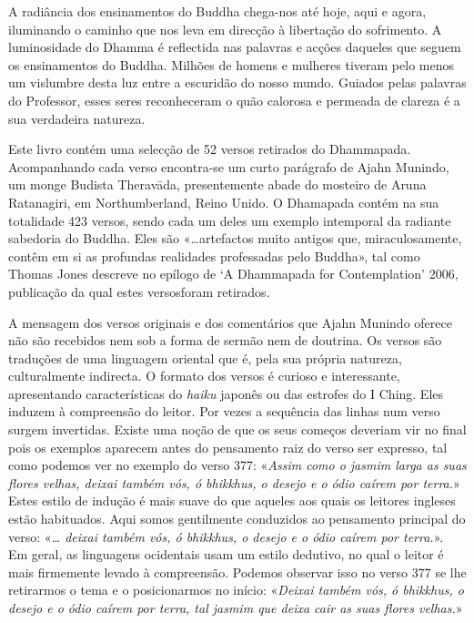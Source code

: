 
A radiância dos ensinamentos do Buddha chega-nos até hoje, aqui e agora, iluminando o caminho que nos leva em direcção à libertação do sofrimento. A luminosidade do Dhamma é reflectida nas palavras e acções daqueles que seguem os ensinamentos do Buddha. Milhões de homens e mulheres tiveram pelo menos um vislumbre desta luz entre a escuridão do nosso mundo. Guiados pelas palavras do Professor, esses seres reconheceram o quão calorosa e permeada de clareza é a sua verdadeira natureza.

Este livro contém uma selecção de 52 versos retirados do Dhammapada. Acompanhando cada verso encontra-se um curto parágrafo de Ajahn Munindo, um monge Budista Theravāda, presentemente abade do mosteiro de Aruna Ratanagiri, em Northumberland, Reino Unido. O Dhamapada contém na sua totalidade 423 versos, sendo cada um deles um exemplo intemporal da radiante sabedoria do Buddha. Eles são «…artefactos muito antigos que, miraculosamente, contêm em si as profundas realidades professadas pelo Buddha», tal como Thomas Jones descreve no epílogo de ‘A Dhammapada for Contemplation’ 2006, publicação da qual estes versos\linebreak foram retirados.

A mensagem dos versos originais e dos comentários que Ajahn Munindo oferece não são recebidos nem sob a forma de sermão nem de doutrina. Os versos são traduções de uma linguagem oriental que é, pela sua própria natureza, culturalmente indirecta. O formato dos versos é curioso e interessante, apresentando características do \textit{haiku} japonês ou das estrofes do I Ching. Eles induzem à compreensão do leitor. Por vezes a sequência das linhas num verso surgem invertidas. Existe uma noção de que os seus começos deveriam vir no final pois os exemplos aparecem antes do pensamento raiz do verso ser expresso, tal como podemos ver no exemplo do verso 377: «\textit{Assim como o jasmim larga as suas flores velhas, deixai também vós, ó bhikkhus, o desejo e o ódio caírem por terra.}» Estes estilo de indução é mais suave do que aqueles aos quais os leitores ingleses estão habituados. Aqui somos gentilmente conduzidos ao pensamento principal do verso: «\textit{… deixai também vós, ó bhikkhus, o desejo e o ódio caírem por terra.}». Em geral, as linguagens ocidentais usam um estilo dedutivo, no qual o leitor é mais firmemente levado à compreensão. Podemos observar isso no verso 377 se lhe retirarmos o tema e o posicionarmos no início: «\textit{Deixai também vós, ó bhikkhus, o desejo e o ódio caírem por terra, tal jasmim que deixa cair as suas flores velhas.}»

